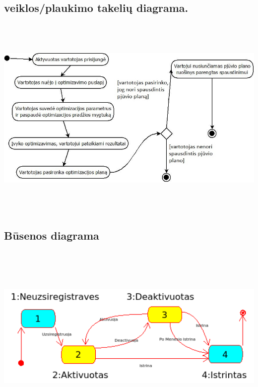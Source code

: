 \documentclass[a4paper,12pt]{article}
\begin{document}
\subsection{veiklos/plaukimo takelių diagrama.}
\begin{frame}
\centering
\includegraphics[width=18cm, height=10cm]{swim}

\end{frame}

\subsection{Būsenos diagrama}

\begin{frame}
\centering
\includegraphics[width=15cm, height=9cm]{state_diagram.png}

\end{frame}
\end{document}
